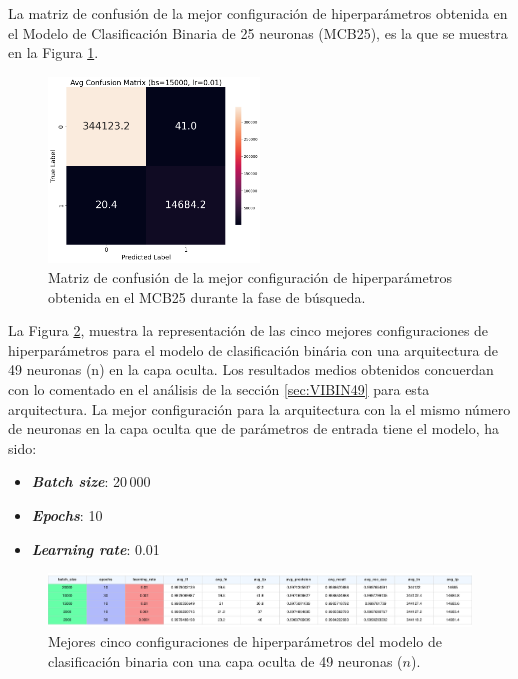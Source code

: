 La matriz de confusión de la mejor configuración de hiperparámetros obtenida en el Modelo de Clasificación Binaria de 25 neuronas (MCB25), es la que se muestra en la Figura \ref{fig:MC_ENT_MCB25}.

\begin{figure}[H]
    \centering
    \includegraphics[width=0.5\textwidth]{./img/modelo/matrices_confusion/MC_ENT_MCB25.png}
    \caption{Matriz de confusión de la mejor configuración de hiperparámetros obtenida en el MCB25 durante la fase de búsqueda.}
    \label{fig:MC_ENT_MCB25}
\end{figure}




La Figura \ref{fig:BINhs49}, muestra la representación de las cinco mejores configuraciones de hiperparámetros para el modelo de clasificación binária con una arquitectura de 49 neuronas (n) en la capa oculta. Los resultados medios obtenidos concuerdan con lo comentado en el análisis de la sección \ref{sec:VIBIN49} para esta arquitectura. La mejor configuración para la arquitectura con la el mismo número de neuronas en la capa oculta que de parámetros de entrada tiene el modelo, ha sido:
\begin{itemize}
	\item \textbf{\textit{Batch size}}: 20\,000
	\item \textbf{\textit{Epochs}}: 10
	\item \textbf{\textit{Learning rate}}: 0.01
\end{itemize}

\begin{figure}[H]
    \centering
    \includegraphics[width=1\textwidth]{./img/modelo/resultados/BINhs49.pdf}
    \caption{Mejores cinco configuraciones de hiperparámetros del modelo de clasificación binaria con una capa oculta de 49 neuronas ($n$).}
    \label{fig:BINhs49}
\end{figure}

